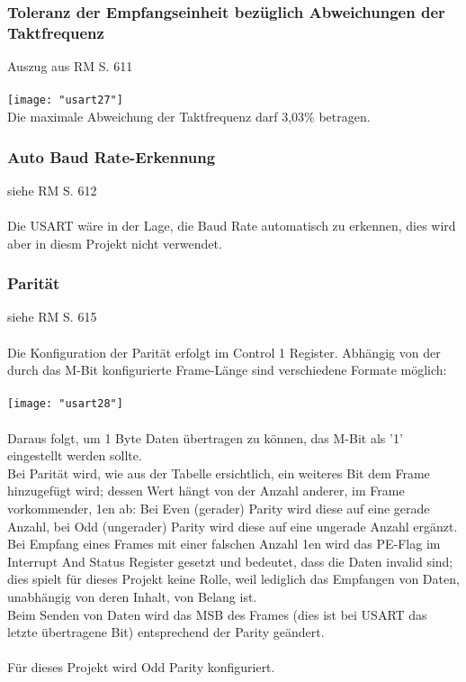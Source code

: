 \documentclass[11pt]{report}
\begin{document}
			\subsubsection{Toleranz der Empfangseinheit bezüglich Abweichungen der Taktfrequenz}
				Auszug aus RM S. 611\\
				\\\texttt{[image: "usart27"]}\\
				Die maximale Abweichung der Taktfrequenz darf 3,03\% betragen.
			\subsubsection{Auto Baud Rate-Erkennung}
				siehe RM S. 612\\
				\\Die USART wäre in der Lage, die Baud Rate automatisch zu erkennen, dies wird aber in diesm Projekt nicht verwendet.
			\subsubsection{Parität}
				\label{sec:parity}
				siehe RM S. 615\\
				\\Die Konfiguration der Parität erfolgt im Control 1 Register. Abhängig von der durch das M-Bit konfigurierte Frame-Länge sind verschiedene Formate möglich:\\
				\\\texttt{[image: "usart28"]}\\
				\\Daraus folgt, um 1 Byte Daten übertragen zu können, das M-Bit als '1' eingestellt werden sollte.\\
				Bei Parität wird, wie aus der Tabelle ersichtlich, ein weiteres Bit dem Frame hinzugefügt wird; dessen Wert hängt von der Anzahl anderer, im Frame vorkommender, 1en ab: Bei Even (gerader) Parity wird diese auf eine gerade Anzahl, bei Odd (ungerader) Parity wird diese auf eine ungerade Anzahl ergänzt.\\
				Bei Empfang eines Frames mit einer falschen Anzahl 1en wird das PE-Flag im Interrupt And Status Register gesetzt und bedeutet, dass die Daten invalid sind; dies spielt für dieses Projekt keine Rolle, weil lediglich das Empfangen von Daten, unabhängig von deren Inhalt, von Belang ist.\\
				Beim Senden von Daten wird das MSB des Frames (dies ist bei USART das letzte übertragene Bit) entsprechend der Parity geändert.\\
				\\Für dieses Projekt wird Odd Parity konfiguriert.
\end{document}
